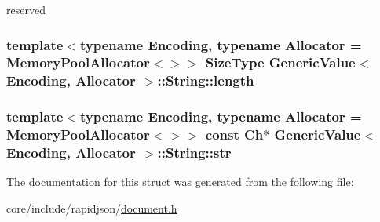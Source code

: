 reserved 

\subsubsection[{\texorpdfstring{length}{length}}]{\setlength{\rightskip}{0pt plus 5cm}template$<$typename Encoding, typename Allocator = Memory\+Pool\+Allocator$<$$>$$>$ {\bf Size\+Type} {\bf Generic\+Value}$<$ Encoding, Allocator $>$\+::String\+::length}\hypertarget{structGenericValue_1_1String_ad6ffab0e093aa8db6e415812ff6443bf}{}\label{structGenericValue_1_1String_ad6ffab0e093aa8db6e415812ff6443bf}
\subsubsection[{\texorpdfstring{str}{str}}]{\setlength{\rightskip}{0pt plus 5cm}template$<$typename Encoding, typename Allocator = Memory\+Pool\+Allocator$<$$>$$>$ const {\bf Ch}$\ast$ {\bf Generic\+Value}$<$ Encoding, Allocator $>$\+::String\+::str}\hypertarget{structGenericValue_1_1String_a4eebc5acf3f93ab833efd82abf3ba84d}{}\label{structGenericValue_1_1String_a4eebc5acf3f93ab833efd82abf3ba84d}


The documentation for this struct was generated from the following file\+:\begin{DoxyCompactItemize}
\item 
core/include/rapidjson/\hyperlink{document_8h}{document.\+h}\end{DoxyCompactItemize}
